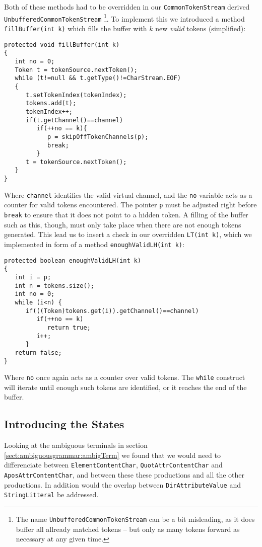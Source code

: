 Both of these methods had to be overridden in our \verb!CommonTokenStream! derived \verb!UnbufferedCommonTokenStream! \footnote{The name \texttt{UnbufferedCommonTokenStream} can be a bit misleading, as it does buffer all allready matched tokens -- but only as many tokens forward as necessary at any given time.}. To implement this we introduced a method \verb!fillBuffer(int k)! which fills the buffer with $k$ new \emph{valid} tokens (simplified):
\begin{Verbatim}
protected void fillBuffer(int k) 
{
   int no = 0;
   Token t = tokenSource.nextToken();
   while (t!=null && t.getType()!=CharStream.EOF) 
   {
      t.setTokenIndex(tokenIndex);
      tokens.add(t);
      tokenIndex++;
      if(t.getChannel()==channel)
         if(++no == k){
            p = skipOffTokenChannels(p);
            break;
         }
      t = tokenSource.nextToken();
   }
}
\end{Verbatim}
Where \verb!channel! identifies the valid virtual channel, and the \verb!no! variable acts as a counter for valid tokens encountered. The pointer \verb!p! must be adjusted right before \verb!break! to ensure that it does not point to a hidden token. A filling of the buffer such as this, though, must only take place when there are not enough tokens generated. This lead us to insert a check in our overridden \verb!LT(int k)!, which we implemented in form of a method \verb!enoughValidLH(int k)!:
\begin{Verbatim}
protected boolean enoughValidLH(int k)
{
   int i = p;
   int n = tokens.size();
   int no = 0;
   while (i<n) {
      if(((Token)tokens.get(i)).getChannel()==channel)
         if(++no == k)
            return true;
         i++;
      }
   return false;
}
\end{Verbatim}
Where \verb!no! once again acts as a counter over valid tokens. The \verb!while! construct will iterate until enough such tokens are identified, or it reaches the end of the buffer.

\subsection{Introducing the States}
\label{sect:rewriteGrammar:introduceStates}
Looking at the ambiguous terminals in section \ref{sect:ambiguousgrammar:ambigTerm} we found that we would need to differenciate between \verb!ElementContentChar!, \verb!QuotAttrContentChar! and \verb!AposAttrContentChar!, and between these these productions and all the other productions. In addition would the overlap between \verb!DirAttributeValue! and \verb!StringLitteral! be addressed. 

